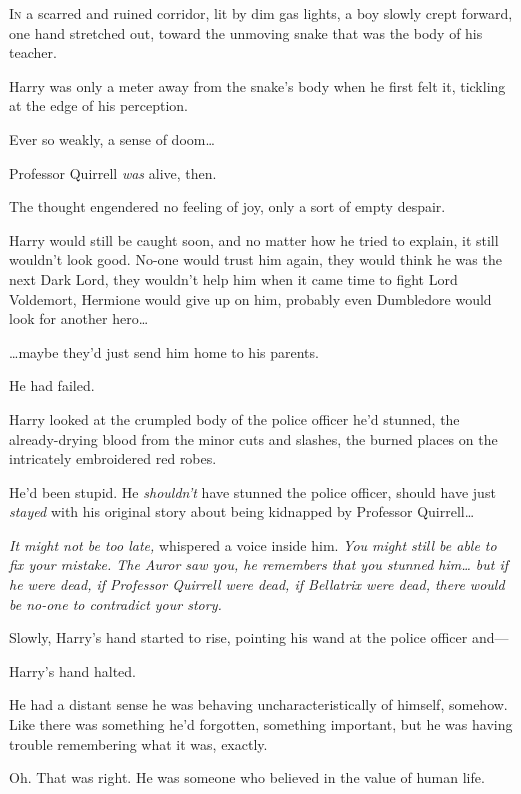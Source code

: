 
\lettrine{I}{n} a scarred and ruined corridor, lit by dim gas lights, a boy slowly crept forward, one hand stretched out, toward the unmoving snake that was the body of his teacher.

Harry was only a meter away from the snake's body when he first felt it, tickling at the edge of his perception.

Ever so weakly, a sense of doom{\ldots}

Professor Quirrell \emph{was} alive, then.

The thought engendered no feeling of joy, only a sort of empty despair.

Harry would still be caught soon, and no matter how he tried to explain, it still wouldn't look good. No-one would trust him again, they would think he was the next Dark Lord, they wouldn't help him when it came time to fight Lord Voldemort, Hermione would give up on him, probably even Dumbledore would look for another hero{\ldots}

{\ldots}maybe they'd just send him home to his parents.

He had failed.

Harry looked at the crumpled body of the police officer he'd stunned, the already-drying blood from the minor cuts and slashes, the burned places on the intricately embroidered red robes.

He'd been stupid. He \emph{shouldn't} have stunned the police officer, should have just \emph{stayed} with his original story about being kidnapped by Professor Quirrell{\ldots}

\emph{It might not be too late,} whispered a voice inside him. \emph{You might still be able to fix your mistake. The Auror saw you, he remembers that you stunned him{\ldots} but if he were dead, if Professor Quirrell were dead, if Bellatrix were dead, there would be no-one to contradict your story.}

Slowly, Harry's hand started to rise, pointing his wand at the police officer and—

Harry's hand halted.

He had a distant sense he was behaving uncharacteristically of himself, somehow. Like there was something he'd forgotten, something important, but he was having trouble remembering what it was, exactly.

Oh. That was right. He was someone who believed in the value of human life.

